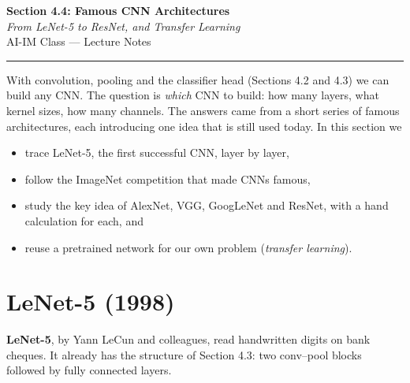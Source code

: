 \documentclass[12pt, a4paper]{article}
\begin{document}
\begin{center}
  {\LARGE \textbf{Section 4.4: Famous CNN Architectures}} \\[0.3em]
  {\large\itshape From LeNet-5 to ResNet, and Transfer Learning} \\[0.5em]
  {\large AI-IM Class --- Lecture Notes}%
  \ifstudentmode
  \fi
\end{center}

\vspace{1em}
\hrule
\vspace{1.5em}

With convolution, pooling and the classifier head (Sections 4.2 and 4.3) we
can build any CNN. The question is \emph{which} CNN to build: how many layers,
what kernel sizes, how many channels. The answers came from a short series of
famous architectures, each introducing one idea that is still used today.
In this section we
\begin{itemize}[nosep]
  \item trace LeNet-5, the first successful CNN, layer by layer,
  \item follow the ImageNet competition that made CNNs famous,
  \item study the key idea of AlexNet, VGG, GoogLeNet and ResNet, with a hand
        calculation for each, and
  \item reuse a pretrained network for our own problem (\emph{transfer
          learning}).
\end{itemize}

\section{LeNet-5 (1998)}

\textbf{LeNet-5}, by Yann LeCun and colleagues, read handwritten digits on
bank cheques. It already has the structure of Section 4.3: two conv--pool
blocks followed by fully connected layers.
\end{document}

